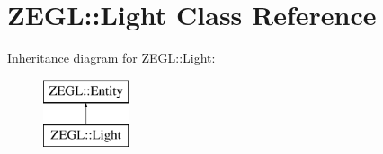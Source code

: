 \hypertarget{class_z_e_g_l_1_1_light}{}\section{Z\+E\+G\+L\+:\+:Light Class Reference}
\label{class_z_e_g_l_1_1_light}
Inheritance diagram for Z\+E\+G\+L\+:\+:Light\+:\begin{figure}[H]
\begin{center}
\leavevmode
\includegraphics[height=2.000000cm]{class_z_e_g_l_1_1_light}
\end{center}
\end{figure}
